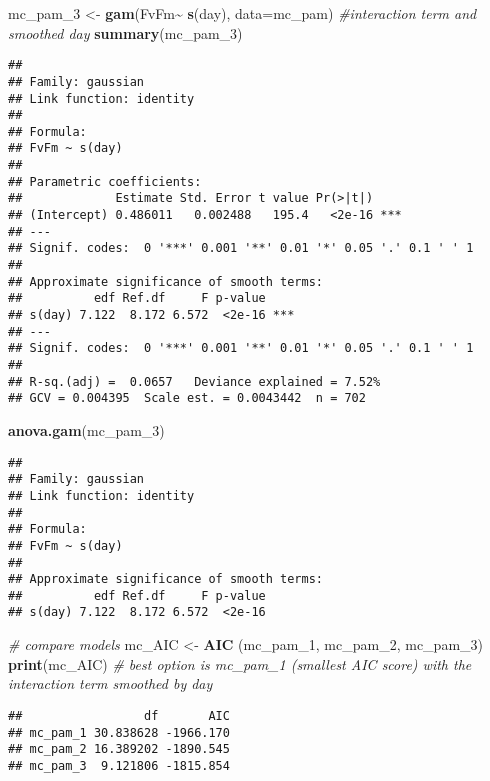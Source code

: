 \documentclass[
]{article}
\newenvironment{Shaded}{\begin{snugshade}}{\end{snugshade}}
\newcommand{\AttributeTok}[1]{\textcolor[rgb]{0.13,0.29,0.53}{#1}}
\newcommand{\CommentTok}[1]{\textcolor[rgb]{0.56,0.35,0.01}{\textit{#1}}}
\newcommand{\FunctionTok}[1]{\textcolor[rgb]{0.13,0.29,0.53}{\textbf{#1}}}
\newcommand{\NormalTok}[1]{#1}
\newcommand{\OtherTok}[1]{\textcolor[rgb]{0.56,0.35,0.01}{#1}}
\newcommand{\SpecialCharTok}[1]{\textcolor[rgb]{0.81,0.36,0.00}{\textbf{#1}}}
\begin{document}
\begin{Shaded}
\begin{Highlighting}[]
\NormalTok{mc\_pam\_3 }\OtherTok{\textless{}{-}} \FunctionTok{gam}\NormalTok{(FvFm}\SpecialCharTok{\textasciitilde{}} \FunctionTok{s}\NormalTok{(day), }\AttributeTok{data=}\NormalTok{mc\_pam) }\CommentTok{\#interaction term and smoothed day}
\FunctionTok{summary}\NormalTok{(mc\_pam\_3)}
\end{Highlighting}
\end{Shaded}

\begin{verbatim}
## 
## Family: gaussian 
## Link function: identity 
## 
## Formula:
## FvFm ~ s(day)
## 
## Parametric coefficients:
##             Estimate Std. Error t value Pr(>|t|)    
## (Intercept) 0.486011   0.002488   195.4   <2e-16 ***
## ---
## Signif. codes:  0 '***' 0.001 '**' 0.01 '*' 0.05 '.' 0.1 ' ' 1
## 
## Approximate significance of smooth terms:
##          edf Ref.df     F p-value    
## s(day) 7.122  8.172 6.572  <2e-16 ***
## ---
## Signif. codes:  0 '***' 0.001 '**' 0.01 '*' 0.05 '.' 0.1 ' ' 1
## 
## R-sq.(adj) =  0.0657   Deviance explained = 7.52%
## GCV = 0.004395  Scale est. = 0.0043442  n = 702
\end{verbatim}

\begin{Shaded}
\begin{Highlighting}[]
\FunctionTok{anova.gam}\NormalTok{(mc\_pam\_3)}
\end{Highlighting}
\end{Shaded}

\begin{verbatim}
## 
## Family: gaussian 
## Link function: identity 
## 
## Formula:
## FvFm ~ s(day)
## 
## Approximate significance of smooth terms:
##          edf Ref.df     F p-value
## s(day) 7.122  8.172 6.572  <2e-16
\end{verbatim}

\begin{Shaded}
\begin{Highlighting}[]
\CommentTok{\# compare models}
\NormalTok{mc\_AIC }\OtherTok{\textless{}{-}} \FunctionTok{AIC}\NormalTok{ (mc\_pam\_1, mc\_pam\_2, mc\_pam\_3)}
\FunctionTok{print}\NormalTok{(mc\_AIC) }\CommentTok{\# best option is mc\_pam\_1 (smallest AIC score) with the interaction term smoothed by day}
\end{Highlighting}
\end{Shaded}

\begin{verbatim}
##                 df       AIC
## mc_pam_1 30.838628 -1966.170
## mc_pam_2 16.389202 -1890.545
## mc_pam_3  9.121806 -1815.854
\end{verbatim}
\end{document}
